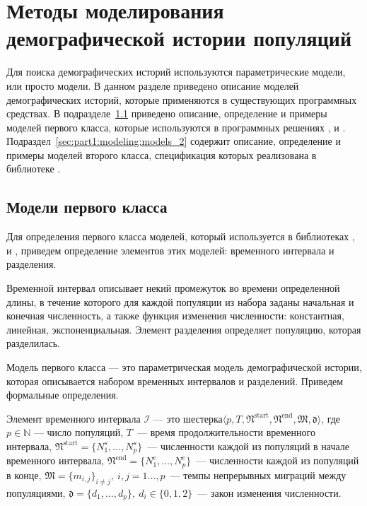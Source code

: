 \section{Методы моделирования демографической истории популяций}
\label{sec:part1:modeling}

Для поиска демографических историй используются параметрические модели, или просто модели.
В данном разделе приведено описание моделей демографических историй, которые применяются в существующих программных средствах.
В подразделе~\ref{sec:part1:modeling:models_1} приведено описание, определение и примеры моделей первого класса, которые используются в программных решениях \dadi, \moments и \momentsLD.
Подраздел~\ref{sec:part1:modeling:models_2} содержит описание, определение и примеры моделей второго класса, спецификация которых реализована в библиотеке \momi.


\subsection{Модели первого класса}
\label{sec:part1:modeling:models_1}

Для определения первого класса моделей, который используется в библиотеках \dadi, \moments и \momentsLD, приведем определение элементов этих моделей: временного интервала и разделения.

Временной интервал описывает некий промежуток во времени определенной длины, в течение которого для каждой популяции из набора заданы начальная и конечная численность, а также функция изменения численности: константная, линейная, экспоненциальная.
Элемент разделения определяет популяцию, которая разделилась.

Модель первого класса --- это параметрическая модель демографической истории, которая описывается набором временных интервалов и разделений.
Приведем формальные определения.

 Элемент временного интервала $\mathcal{I}$ --- это шестерка\linebreak ${\langle p, T, \mathfrak{N}^\text{start}, \mathfrak{N}^\text{end}, \mathfrak{M}, \mathfrak{d} \rangle}$, где $p \in \mathbb{N}$ --- число популяций, $T$~--- время продолжительности временного интервала, $\mathfrak{N}^\text{start} = \{N^s_1, \ldots,N^s_p\}$~--- численности каждой из популяций в начале временного интервала, ${\mathfrak{N}^\text{end} = \{N^e_1, \ldots,N^e_p\}}$~--- численности каждой из популяций в конце, ${\mathfrak{M} = \{m_{i, j}\}_{i \neq j},\ i,j=1\dots, p}$~--- темпы непрерывных миграций между популяциями, ${\mathfrak{d} = \{d_1, \ldots,d_p\},\ d_i \in \{0, 1, 2\}}$~--- закон изменения численности.

